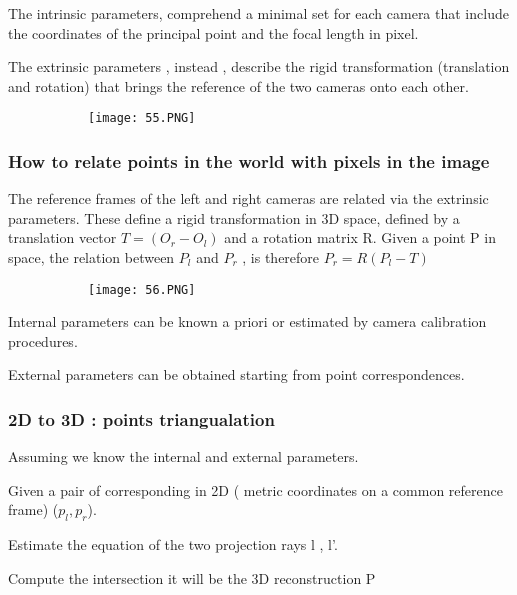 \documentclass{article}
\begin{document}
The intrinsic parameters, comprehend a minimal set for each camera that include  the coordinates of the principal point and the focal length in pixel.

The extrinsic parameters , instead , describe the rigid transformation (translation and rotation) that brings the reference of the two cameras onto each other.


\begin{figure}[ht!]
  \centering
  \begin{subfigure}[b]{0.3\linewidth}
    \texttt{[image: 55.PNG]}
  \end{subfigure}
\end{figure}

\subsubsection{How to relate points in the world with pixels in the image}

The reference frames of the left and right cameras are related via the extrinsic parameters. These define a rigid transformation in 3D space, defined by a translation vector $T = (O_r - O_l)$ and a rotation matrix R. Given a point P in space, the relation between $P_l$ and $P_r$ , is therefore $P_r = R(P_l -T)$

\begin{figure}[ht!]
  \centering
  \begin{subfigure}[b]{0.5\linewidth}
    \texttt{[image: 56.PNG]}
  \end{subfigure}
\end{figure}

Internal parameters can be known a priori or estimated by camera calibration procedures.

External parameters can be obtained starting from point correspondences.

\subsubsection{2D to 3D : points triangualation}

Assuming we know the internal and external parameters.

Given a pair of corresponding in 2D ( metric coordinates on a common reference frame) ($p_l , p_r$).

Estimate the equation of the two projection rays l , l'.

Compute the intersection it will be the 3D reconstruction P
\end{document}
